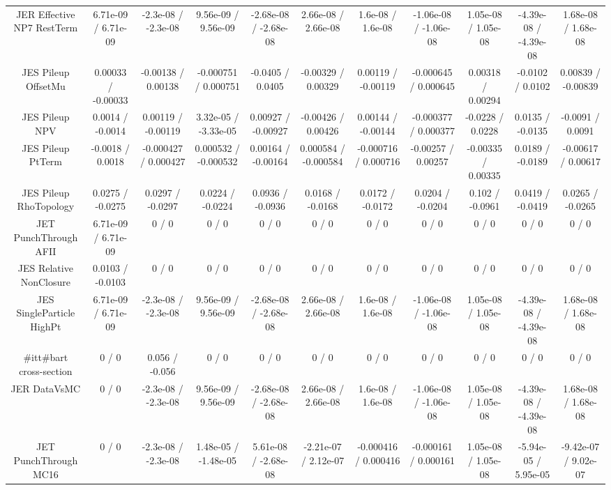 \begin{table}[htbp]
\begin{center}
\begin{tabular}{|c|c|c|c|c|c|c|c|c|c|c|}
  JER Effective NP7 RestTerm & 6.71e-09 / 6.71e-09 & -2.3e-08 / -2.3e-08 & 9.56e-09 / 9.56e-09 & -2.68e-08 / -2.68e-08 & 2.66e-08 / 2.66e-08 & 1.6e-08 / 1.6e-08 & -1.06e-08 / -1.06e-08 & 1.05e-08 / 1.05e-08 & -4.39e-08 / -4.39e-08 & 1.68e-08 / 1.68e-08 \\ 
  JES Pileup OffsetMu & 0.00033 / -0.00033 & -0.00138 / 0.00138 & -0.000751 / 0.000751 & -0.0405 / 0.0405 & -0.00329 / 0.00329 & 0.00119 / -0.00119 & -0.000645 / 0.000645 & 0.00318 / 0.00294 & -0.0102 / 0.0102 & 0.00839 / -0.00839 \\ 
  JES Pileup NPV & 0.0014 / -0.0014 & 0.00119 / -0.00119 & 3.32e-05 / -3.33e-05 & 0.00927 / -0.00927 & -0.00426 / 0.00426 & 0.00144 / -0.00144 & -0.000377 / 0.000377 & -0.0228 / 0.0228 & 0.0135 / -0.0135 & -0.0091 / 0.0091 \\ 
  JES Pileup PtTerm & -0.0018 / 0.0018 & -0.000427 / 0.000427 & 0.000532 / -0.000532 & 0.00164 / -0.00164 & 0.000584 / -0.000584 & -0.000716 / 0.000716 & -0.00257 / 0.00257 & -0.00335 / 0.00335 & 0.0189 / -0.0189 & -0.00617 / 0.00617 \\ 
  JES Pileup RhoTopology & 0.0275 / -0.0275 & 0.0297 / -0.0297 & 0.0224 / -0.0224 & 0.0936 / -0.0936 & 0.0168 / -0.0168 & 0.0172 / -0.0172 & 0.0204 / -0.0204 & 0.102 / -0.0961 & 0.0419 / -0.0419 & 0.0265 / -0.0265 \\ 
  JET PunchThrough AFII & 6.71e-09 / 6.71e-09 & 0 / 0 & 0 / 0 & 0 / 0 & 0 / 0 & 0 / 0 & 0 / 0 & 0 / 0 & 0 / 0 & 0 / 0 \\ 
  JES Relative NonClosure & 0.0103 / -0.0103 & 0 / 0 & 0 / 0 & 0 / 0 & 0 / 0 & 0 / 0 & 0 / 0 & 0 / 0 & 0 / 0 & 0 / 0 \\ 
  JES SingleParticle HighPt & 6.71e-09 / 6.71e-09 & -2.3e-08 / -2.3e-08 & 9.56e-09 / 9.56e-09 & -2.68e-08 / -2.68e-08 & 2.66e-08 / 2.66e-08 & 1.6e-08 / 1.6e-08 & -1.06e-08 / -1.06e-08 & 1.05e-08 / 1.05e-08 & -4.39e-08 / -4.39e-08 & 1.68e-08 / 1.68e-08 \\ 
  #it{t#bar{t}} cross-section & 0 / 0 & 0.056 / -0.056 & 0 / 0 & 0 / 0 & 0 / 0 & 0 / 0 & 0 / 0 & 0 / 0 & 0 / 0 & 0 / 0 \\ 
  JER DataVsMC & 0 / 0 & -2.3e-08 / -2.3e-08 & 9.56e-09 / 9.56e-09 & -2.68e-08 / -2.68e-08 & 2.66e-08 / 2.66e-08 & 1.6e-08 / 1.6e-08 & -1.06e-08 / -1.06e-08 & 1.05e-08 / 1.05e-08 & -4.39e-08 / -4.39e-08 & 1.68e-08 / 1.68e-08 \\ 
  JET PunchThrough MC16 & 0 / 0 & -2.3e-08 / -2.3e-08 & 1.48e-05 / -1.48e-05 & 5.61e-08 / -2.68e-08 & -2.21e-07 / 2.12e-07 & -0.000416 / 0.000416 & -0.000161 / 0.000161 & 1.05e-08 / 1.05e-08 & -5.94e-05 / 5.95e-05 & -9.42e-07 / 9.02e-07 \\ 

\end{tabular}
\end{center}
\end{table}
